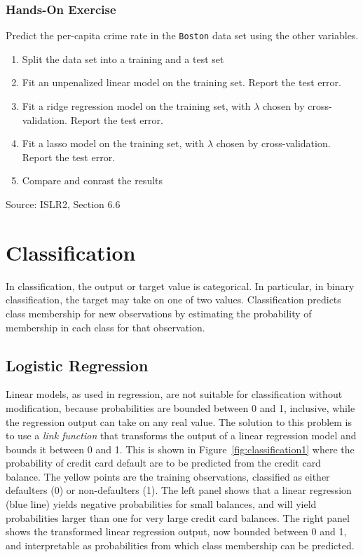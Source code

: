\begin{tcolorbox}[colback=code]
\subsubsection*{Hands-On Exercise} 

Predict the per-capita crime rate in the \texttt{Boston} data set using the other variables.
  \begin{enumerate}
      \item Split the data set into a training and a test set
      \item Fit an unpenalized linear model on the training set. Report the test error.
      \item Fit a ridge regression model on the training set, with $\lambda$ chosen by cross-validation. Report the test error.
      \item Fit a lasso model on the training set, with $\lambda$ chosen by cross-validation. Report the test error.
      \item Compare and conrast the results
  \end{enumerate}

\footnotesize Source: ISLR2, Section 6.6 \normalsize
\end{tcolorbox}

\section{Classification}

In classification, the output or target value is categorical. In particular, in binary classification, the target may take on one of two values. Classification predicts class membership for new observations by estimating the probability of membership in each class for that observation. 

\subsection{Logistic Regression}

Linear models, as used in regression, are not suitable for classification without modification, because probabilities are bounded between 0 and 1, inclusive, while the regression output can take on any real value. The solution to this problem is to use a \emph{link function} that transforms the output of a linear regression model and bounds it between 0 and 1. This is shown in Figure~\ref{fig:classification1} where the probability of credit card default are to be predicted from the credit card balance. The yellow points are the training observations, classified as either defaulters (0) or non-defaulters (1). The left panel shows that a linear regression (blue line) yields negative probabilities for small balances, and will yield probabilities larger than one for very large credit card balances. The right panel shows the transformed linear regression output, now bounded between 0 and 1, and interpretable as probabilities from which class membership can be predicted.


